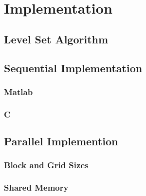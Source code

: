 \chapter{Implementation}

	\section{Level Set Algorithm}\label{levelsetalgorithm}
	

	\section{Sequential Implementation}
		\subsection{Matlab}
		\subsection{C}

	\section{Parallel Implemention}
		\subsection{Block and Grid Sizes}
		\subsection{Shared Memory}